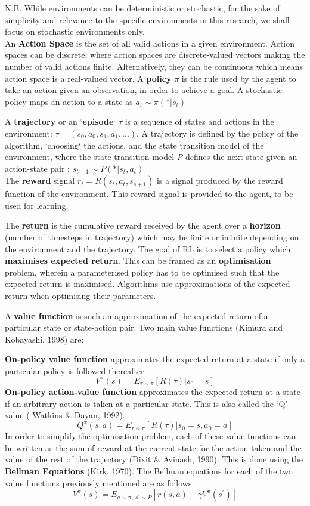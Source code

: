 N.B. While environments can be deterministic or stochastic, for the sake of simplicity and relevance to the specific environments in this research, we shall focus on stochastic environments only.
\\

An \textbf{Action Space} is the set of all valid actions in a given environment. Action spaces can be discrete, where action spaces are discrete-valued vectors making the number of valid actions finite. Alternatively, they can be continuous which means action space is a real-valued vector. A \textbf{policy} $\pi$ is the rule used by the agent to take an action given an observation, in order to achieve a goal. A stochastic policy maps an action to a state as 
$a_{t} \sim \pi  (*|s_{t})$

A \textbf{trajectory} or an `\textbf{episode}` $\tau$ is a sequence of states and actions in the environment:
$\tau = (s_{0},a_{0},s_{1},a_{1},...) $.
A trajectory is defined by the policy of the algorithm, `choosing` the actions, and the state transition model of the environment, where the state transition model \textit{P} defines the next state given an action-state pair :
$s_{t+1} \sim P(*|s_{t},a_{t})$\\

The \textbf{reward} signal $r_{t} = R(s_{t},a_{t},s_{s+1})$ is a signal produced by the reward function of the environment. This reward signal is provided to the agent, to be used for learning. 

The \textbf{return} is the cumulative reward received by the agent over a \textbf{horizon} (number of timesteps in trajectory) which may be finite or infinite depending on the environment and the trajectory. The goal of RL is to select a policy which \textbf{maximises expected return}. This can be framed as an \textbf{optimisation} problem, wherein a parameterised policy has to be optimised such that the expected return is maximised. Algorithms use approximations of the expected return when optimising their parameters. 

A \textbf{value function} is such an approximation of the expected return of a particular state or state-action pair. Two main value functions (Kimura and Kobayashi, 1998) are: 

\textbf{On-policy value function} approximates the expected return at a state if only a particular policy is followed thereafter: 
\[V^{\pi}(s) = E_{\tau \sim \pi}[R(\tau)|s_{0} = s] \]
\textbf{On-policy action-value function} approximates the expected return at a state if an arbitrary action is taken at a particular state. This is also called the ‘Q’ value ( Watkins \& Dayan, 1992). 
\[ Q^{\pi}(s,a) = E_{\tau \sim \pi}[R(\tau)|s_{0} = s,a_{0}=a] \]
In order to simplify the optimisation problem, each of these value functions can be written as the sum of reward at the current state for the action taken and the value of the rest of the trajectory (Dixit \& Avinash, 1990). This is done using the \textbf{Bellman Equations} (Kirk, 1970). The Bellman equations for each of the two value functions previously mentioned are as follows:
\[ V^{\pi}(s) = E_{a \sim \pi ,\ s^{\prime} \sim P}[r(s,a) + \gamma V^{\pi}(s^{\prime})]\]

